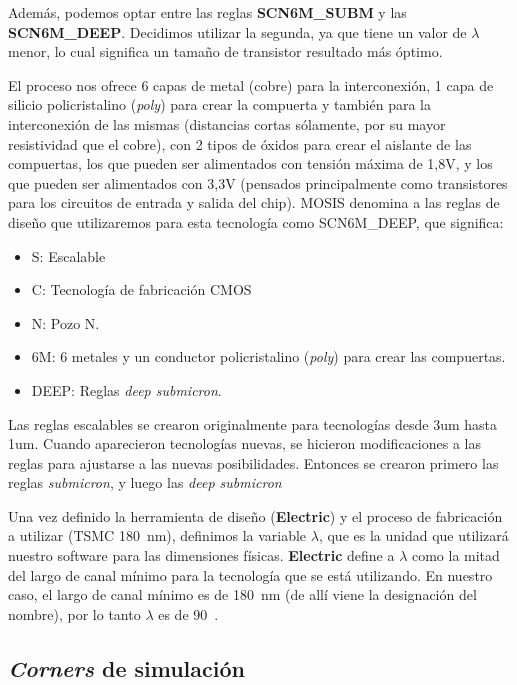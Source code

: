 Además, podemos optar entre las reglas \textbf{SCN6M\_SUBM} y las \textbf{SCN6M\_DEEP}. Decidimos utilizar la segunda, ya que tiene un valor de $\lambda$ menor, lo cual significa un tamaño de transistor resultado más óptimo.

El proceso nos ofrece 6 capas de metal (cobre) para la interconexión, 1 capa de silicio policristalino (\emph{poly}) para crear la compuerta y también para la interconexión de las mismas (distancias cortas sólamente, por su mayor resistividad que el cobre), con 2 tipos de óxidos para crear el aislante de las compuertas, los que pueden ser alimentados con tensión máxima de 1,8V, y los que pueden ser alimentados con 3,3V (pensados principalmente como transistores para los circuitos de entrada y salida del chip). MOSIS denomina a las reglas de diseño que utilizaremos para esta tecnología como SCN6M\_DEEP, que significa: 
\begin{itemize}
\item S: Escalable
\item C: Tecnología de fabricación CMOS
\item N: Pozo N.
\item 6M: 6 metales y un conductor policristalino (\emph{poly}) para crear las compuertas.
\item DEEP: Reglas \emph{deep submicron}.
\end{itemize}
Las reglas escalables se crearon originalmente para tecnologías desde 3um hasta 1um. Cuando aparecieron tecnologías nuevas, se hicieron modificaciones a las reglas para ajustarse a las nuevas posibilidades. Entonces se crearon primero las reglas \emph{submicron}, y luego las \emph{deep submicron}

Una vez definido la herramienta de diseño (\textbf{Electric}) y el proceso de fabricación a utilizar (TSMC 180~nm), definimos la variable $\lambda$, que es la unidad que utilizará nuestro software para las dimensiones físicas. \textbf{Electric} define a $\lambda$ como la mitad del largo de canal mínimo para la tecnología que se está utilizando. En nuestro caso, el largo de canal mínimo es de 180~nm (de allí viene la designación del nombre), por lo tanto $\lambda $ es de 90~\nanom.  


\subsection{\emph{Corners} de simulación}


